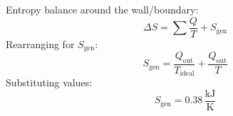 Entropy balance around the wall/boundary:  
\[
\Delta S = \sum \frac{Q}{T} + S_{\text{gen}}
\]  
Rearranging for \( S_{\text{gen}} \):  
\[
S_{\text{gen}} = \frac{Q_{\text{out}}}{T_{\text{ideal}}} + \frac{Q_{\text{out}}}{T}
\]  
Substituting values:  
\[
S_{\text{gen}} = 0.38 \, \frac{\text{kJ}}{\text{K}}
\]